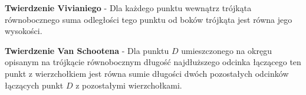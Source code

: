\documentclass[14pt,a4paper]{extarticle}
\begin{document}
\hfill\break
\noindent \textbf{Twierdzenie Vivianiego} - Dla każdego punktu wewnątrz trójkąta równobocznego suma odległości tego punktu
od boków trójkąta jest równa jego wysokości.

\MoveBelowBox
\hfill\break
{}
\hfill\break
\noindent \textbf{Twierdzenie Van Schootena} - Dla punktu $D$ umieszczonego na okręgu opisanym na trójkącie równobocznym długość najdłuższego
odcinka łączącego ten punkt z wierzchołkiem jest równa sumie długości dwóch pozostałych odcinków łączących
punkt $D$ z pozostałymi wierzchołkami.\\
\end{document}
